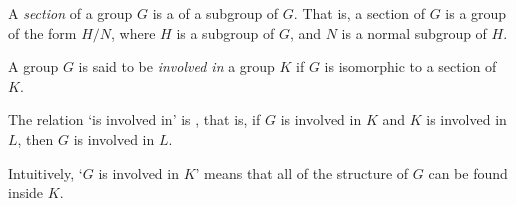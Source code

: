 \documentclass[12pt]{article}
\begin{document}

A \emph{section} of a group $G$ is
a  of a subgroup of $G$.
That is, a section of $G$ is a group of the form $H/N$,
where $H$ is a subgroup of $G$, and $N$ is a normal subgroup of $H$.

A group $G$ is said to be \emph{involved in} a group $K$
if $G$ is isomorphic to a section of $K$.

The relation `is involved in' is ,
that is, if $G$ is involved in $K$ and $K$ is involved in $L$,
then $G$ is involved in $L$.

Intuitively, `$G$ is involved in $K$'
means that all of the structure of $G$ can be found inside $K$.
\end{document}
